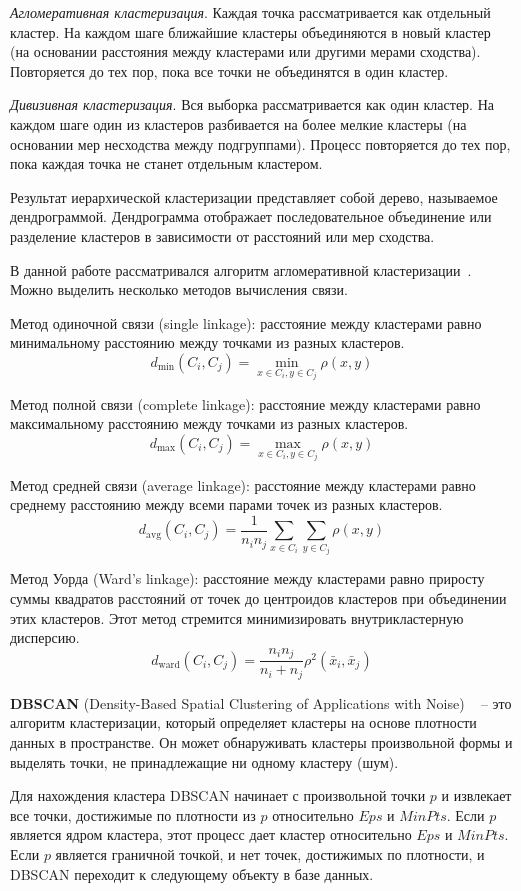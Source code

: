 \textit{Агломеративная кластеризация}. Каждая точка рассматривается как отдельный кластер. На каждом шаге ближайшие кластеры объединяются в новый кластер (на основании расстояния между кластерами или другими мерами сходства). Повторяется до тех пор, пока все точки не объединятся в один кластер.
    
\textit{Дивизивная кластеризация}. Вся выборка рассматривается как один кластер. На каждом шаге один из кластеров разбивается на более мелкие кластеры (на основании мер несходства между подгруппами). Процесс повторяется до тех пор, пока каждая точка не станет отдельным кластером.
    
Результат иерархической кластеризации представляет собой дерево, называемое дендрограммой. Дендрограмма отображает последовательное объединение или разделение кластеров в зависимости от расстояний или мер сходства.

В данной работе рассматривался алгоритм агломеративной кластеризации~\cite{Banfield1993ModelbasedGA}. Можно выделить несколько методов вычисления связи.

Метод одиночной связи (single linkage): расстояние между кластерами равно минимальному расстоянию между точками из разных кластеров.
\[ d_{\min}(C_i, C_j) = \min_{x \in C_i, y \in C_j} \rho(x, y) \]

Метод полной связи (complete linkage): расстояние между кластерами равно максимальному расстоянию между точками из разных кластеров.
\[ d_{\max}(C_i, C_j) = \max_{x \in C_i, y \in C_j} \rho(x, y) \]

Метод средней связи (average linkage): расстояние между кластерами равно среднему расстоянию между всеми парами точек из разных кластеров.
\[ d_{\text{avg}}(C_i, C_j) = \frac{1}{n_i n_j} \sum_{x \in C_i} \sum_{y \in C_j} \rho(x, y) \]

Метод Уорда (Ward's linkage): расстояние между кластерами равно приросту суммы квадратов расстояний от точек до центроидов кластеров при объединении этих кластеров. Этот метод стремится минимизировать внутрикластерную дисперсию.
\[ d_{\text{ward}}(C_i, C_j) = \frac{n_i n_j}{n_i + n_j} \rho^2(\bar{x}_i, \bar{x}_j) \]


\textbf{DBSCAN} (Density-Based Spatial Clustering of Applications with Noise) ~\cite{EsterKSX96} -- это алгоритм кластеризации, который определяет кластеры на основе плотности данных в пространстве. Он может обнаруживать кластеры произвольной формы и выделять точки, не принадлежащие ни одному кластеру (шум).
    
Для нахождения кластера DBSCAN начинает с произвольной точки $p$ и извлекает все точки, достижимые по плотности из $p$ относительно $Eps$ и $MinPts$. Если $p$ является ядром кластера, этот процесс дает кластер относительно $Eps$ и $MinPts$. Если $p$ является граничной точкой, и нет точек, достижимых по плотности, и DBSCAN переходит к следующему объекту в базе данных.

